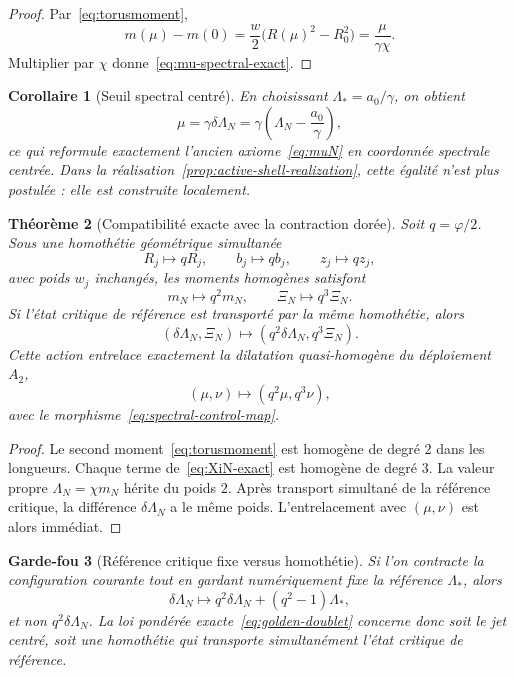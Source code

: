\documentclass[11pt,a4paper]{article}
\newtheorem{theorem}{Théorème}[section]
\newtheorem{corollary}[theorem]{Corollaire}
\newtheorem{guardrail}[theorem]{Garde-fou}
\newcommand{\ph}{\varphi}
\begin{document}
\begin{proof}
Par~\eqref{eq:torusmoment},
\[
 m(\mu)-m(0)=\frac w2\bigl(R(\mu)^2-R_0^2\bigr)
 =\frac{\mu}{\gamma\chi}.
\]
Multiplier par $\chi$ donne~\eqref{eq:mu-spectral-exact}.
\end{proof}

\begin{corollary}[Seuil spectral centré]
En choisissant $\Lambda_*=a_0/\gamma$, on obtient
\[
 \boxed{\mu=\gamma\delta\Lambda_N
 =\gamma\left(\Lambda_N-\frac{a_0}{\gamma}\right),}
\]
ce qui reformule exactement l'ancien axiome~\eqref{eq:muN} en coordonnée spectrale centrée. Dans la réalisation~\ref{prop:active-shell-realization}, cette égalité n'est plus postulée : elle est construite localement.
\end{corollary}

\begin{theorem}[Compatibilité exacte avec la contraction dorée]\label{thm:golden-enriched-spectrum}
Soit $q=\ph/2$. Sous une homothétie géométrique simultanée
\[
 R_j\mapsto qR_j,\qquad b_j\mapsto qb_j,\qquad z_j\mapsto qz_j,
\]
avec poids $w_j$ inchangés, les moments homogènes satisfont
\begin{equation}\label{eq:golden-moments23}
 m_N\mapsto q^2m_N,
 \qquad
 \Xi_N\mapsto q^3\Xi_N.
\end{equation}
Si l'état critique de référence est transporté par la même homothétie, alors
\begin{equation}\label{eq:golden-doublet}
 \boxed{(\delta\Lambda_N,\Xi_N)
 \mapsto(q^2\delta\Lambda_N,q^3\Xi_N).}
\end{equation}
Cette action entrelace exactement la dilatation quasi-homogène du déploiement $A_2$,
\[
 (\mu,\nu)\mapsto(q^2\mu,q^3\nu),
\]
avec le morphisme~\eqref{eq:spectral-control-map}.
\end{theorem}

\begin{proof}
Le second moment~\eqref{eq:torusmoment} est homogène de degré $2$ dans les longueurs. Chaque terme de~\eqref{eq:XiN-exact} est homogène de degré $3$. La valeur propre $\Lambda_N=\chi m_N$ hérite du poids $2$. Après transport simultané de la référence critique, la différence $\delta\Lambda_N$ a le même poids. L'entrelacement avec $(\mu,\nu)$ est alors immédiat.
\end{proof}

\begin{guardrail}[Référence critique fixe versus homothétie]
Si l'on contracte la configuration courante tout en gardant numériquement fixe la référence $\Lambda_*$, alors
\[
 \delta\Lambda_N\mapsto q^2\delta\Lambda_N+(q^2-1)\Lambda_*,
\]
et non $q^2\delta\Lambda_N$. La loi pondérée exacte~\eqref{eq:golden-doublet} concerne donc soit le jet centré, soit une homothétie qui transporte simultanément l'état critique de référence.
\end{guardrail}
\end{document}
